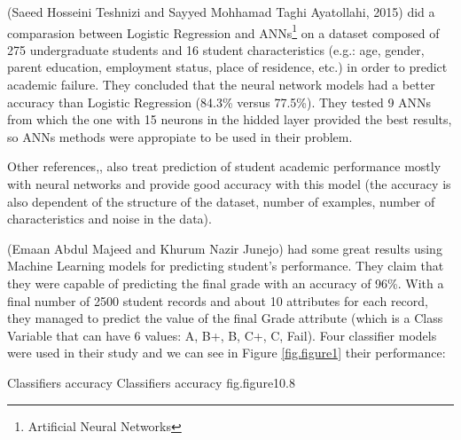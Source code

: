 (Saeed Hosseini Teshnizi and Sayyed Mohhamad Taghi Ayatollahi, 2015)\cite{bibl_3} 
did a comparasion between Logistic Regression and ANNs\footnote{Artificial 
Neural Networks} on a dataset composed of 275 undergraduate students and 16 
student characteristics (e.g.: age, gender, parent education, employment status, 
place of residence, etc.) in order to predict academic failure. They concluded that 
the neural network models had a better accuracy than Logistic Regression (84.3\% 
versus 77.5\%). They tested 9 ANNs from which the one with 15 neurons in the 
hidded layer provided the best results, so ANNs methods were appropiate to be used 
in their problem. 

Other references\cite{bibl_4},\cite{bibl_5},\cite{bibl_6} also treat prediction 
of student academic performance mostly with neural networks and provide good 
accuracy with this model (the accuracy is also dependent of the structure of 
the dataset, number of examples, number of characteristics and noise in the 
data).

(Emaan Abdul Majeed and Khurum Nazir Junejo)\cite{bibl_7} had some great results 
using Machine Learning models for predicting student's performance. They claim 
that they were capable of predicting the final grade with an accuracy of 96\%. 
With a final number of 2500 student records and about 10 attributes for each 
record, they managed to predict the value of the final Grade attribute (which 
is a Class Variable that can have 6 values: A, B+, B, C+, C, Fail). 
Four classifier models were used in their study and we can see in Figure 
\ref{fig.figure1}\cite{bibl_7} their performance: 

%
    {Classifiers accuracy}%
    {Classifiers accuracy}%
    {fig.figure1}{0.8}
